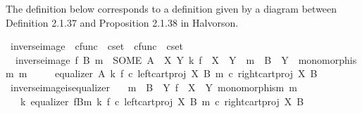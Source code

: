 \begin{isabellebody}
{\isafolddocument}%
%
\isadelimdocument
%
\endisadelimdocument
%
\begin{isamarkuptext}%
The definition below corresponds to a definition given by a diagram between Definition 2.1.37 and Proposition 2.1.38 in Halvorson.%
\end{isamarkuptext}\isamarkuptrue%
\isamarkupfalse%
\ inverse{\isacharunderscore}{\kern0pt}image\ {\isacharcolon}{\kern0pt}{\isacharcolon}{\kern0pt}\ {\isachardoublequoteopen}cfunc\ {\isasymRightarrow}\ cset\ {\isasymRightarrow}\ cfunc\ {\isasymRightarrow}\ cset{\isachardoublequoteclose}\ {\isacharparenleft}{\kern0pt}{\isachardoublequoteopen}{\isacharunderscore}{\kern0pt}\isactrlsup {\isacharminus}{\kern0pt}\isactrlbsub {\isacharunderscore}{\kern0pt}\isactrlesub {\isachardoublequoteclose}\ {\isacharbrackleft}{\kern0pt}{}{}{}{\isacharcomma}{\kern0pt}{}{\isacharcomma}{\kern0pt}{}{\isacharbrackright}{\kern0pt}{}{}{}{\isacharparenright}{\kern0pt}\ \isanewline
\ \ {\isachardoublequoteopen}inverse{\isacharunderscore}{\kern0pt}image\ f\ B\ m\ {\isacharequal}{\kern0pt}\ {\isacharparenleft}{\kern0pt}SOME\ A{\isachardot}{\kern0pt}\ {\isasymexists}\ X\ Y\ k{\isachardot}{\kern0pt}\ f\ {\isacharcolon}{\kern0pt}\ X\ {\isasymrightarrow}\ Y\ {\isasymand}\ m\ {\isacharcolon}{\kern0pt}\ B\ {\isasymrightarrow}\ Y\ {\isasymand}\ monomorphism\ m\ {\isasymand}\isanewline
\ \ \ \ equalizer\ A\ k\ {\isacharparenleft}{\kern0pt}f\ {\isasymcirc}\isactrlsub c\ left{\isacharunderscore}{\kern0pt}cart{\isacharunderscore}{\kern0pt}proj\ X\ B{\isacharparenright}{\kern0pt}\ {\isacharparenleft}{\kern0pt}m\ {\isasymcirc}\isactrlsub c\ right{\isacharunderscore}{\kern0pt}cart{\isacharunderscore}{\kern0pt}proj\ X\ B{\isacharparenright}{\kern0pt}{\isacharparenright}{\kern0pt}{\isachardoublequoteclose}\isanewline
\isanewline
{}\isamarkupfalse%
\ inverse{\isacharunderscore}{\kern0pt}image{\isacharunderscore}{\kern0pt}is{\isacharunderscore}{\kern0pt}equalizer{\isacharcolon}{\kern0pt}\isanewline
\ \ \ {\isachardoublequoteopen}m\ {\isacharcolon}{\kern0pt}\ B\ {\isasymrightarrow}\ Y{\isachardoublequoteclose}\ {\isachardoublequoteopen}f\ {\isacharcolon}{\kern0pt}\ X\ {\isasymrightarrow}\ Y{\isachardoublequoteclose}\ {\isachardoublequoteopen}monomorphism\ m{\isachardoublequoteclose}\isanewline
\ \ \ {\isachardoublequoteopen}{\isasymexists}k{\isachardot}{\kern0pt}\ equalizer\ {\isacharparenleft}{\kern0pt}f\isactrlsup {\isacharminus}{\kern0pt}B{\isasymrparr}\isactrlbsub m\isactrlesub {\isacharparenright}{\kern0pt}\ k\ {\isacharparenleft}{\kern0pt}f\ {\isasymcirc}\isactrlsub c\ left{\isacharunderscore}{\kern0pt}cart{\isacharunderscore}{\kern0pt}proj\ X\ B{\isacharparenright}{\kern0pt}\ {\isacharparenleft}{\kern0pt}m\ {\isasymcirc}\isactrlsub c\ right{\isacharunderscore}{\kern0pt}cart{\isacharunderscore}{\kern0pt}proj\ X\ B{\isacharparenright}{\kern0pt}{\isachardoublequoteclose}\isanewline

\end{isabellebody}
